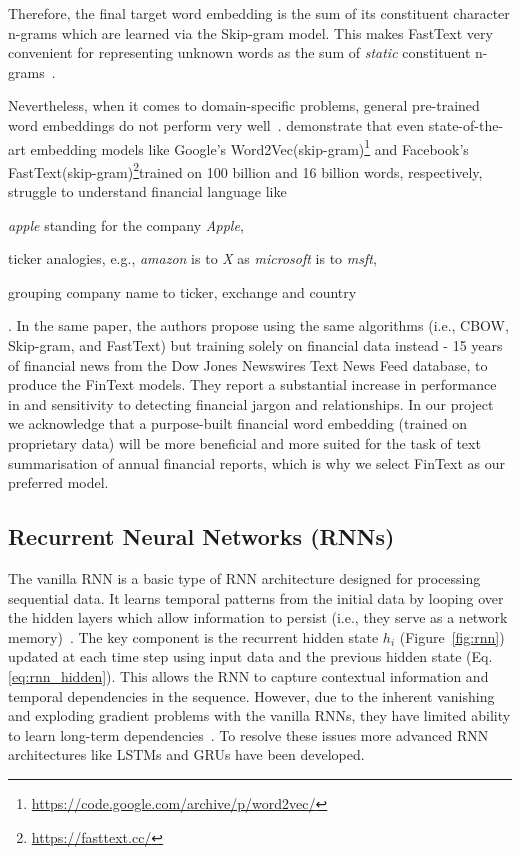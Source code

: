 Therefore, the final target word embedding is the sum of its constituent character n-grams which are learned via the Skip-gram model.
This makes FastText very convenient for representing unknown words as the sum of \emph{static} constituent n-grams~\cite{jurafsky2000}.

Nevertheless, when it comes to domain-specific problems, general pre-trained word embeddings do not perform very well~\cite{rahimikia2021realised}.
demonstrate that even state-of-the-art embedding models like Google's Word2Vec(skip-gram)\footnote{\url{https://code.google.com/archive/p/word2vec/}} and Facebook’s FastText(skip-gram)\footnote{\url{https://fasttext.cc/}}trained on 100 billion and 16 billion words, respectively, struggle to understand financial language like \begin{enumerate*}
    \item \emph{apple} standing for the company \emph{Apple},
    \item ticker analogies, e.g., \emph{amazon} is to \emph{X} as \emph{microsoft} is to \emph{msft},
    \item grouping company name to ticker, exchange and country
\end{enumerate*}.
In the same paper, the authors propose using the same algorithms (i.e., CBOW, Skip-gram, and FastText) but training solely on financial data instead - 15 years of financial news from the Dow Jones Newswires Text News Feed database, to produce the FinText models.
They report a substantial increase in performance in and sensitivity to detecting financial jargon and relationships.
In our project we acknowledge that a purpose-built financial word embedding (trained on proprietary data) will be more beneficial and more suited for the task of text summarisation of annual financial reports, which is why we select FinText as our preferred model.

\subsection{Recurrent Neural Networks (RNNs)}\label{subsec:rnn}
The vanilla RNN is a basic type of RNN architecture designed for processing sequential data.
It learns temporal patterns from the initial data by looping over the hidden layers which allow information to persist (i.e., they serve as a network memory)~\cite{olah2015understandingLSTM}.
The key component is the recurrent hidden state $h_i$ (Figure~\ref{fig:rnn}) updated at each time step using input data and the previous hidden state (Eq.\ref{eq:rnn_hidden}).
This allows the RNN to capture contextual information and temporal dependencies in the sequence.
However, due to the inherent vanishing and exploding gradient problems with the vanilla RNNs, they have limited ability to learn long-term dependencies~\cite{bengio1994learning}.
To resolve these issues more advanced RNN architectures like LSTMs and GRUs have been developed.

